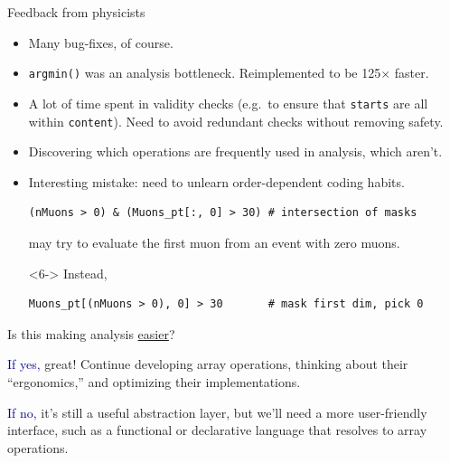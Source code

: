 \documentclass[aspectratio=169]{beamer}
\begin{document}
\begin{frame}[fragile]{Feedback from physicists}
\vspace{0.5 cm}\large
\begin{itemize}\setlength{\itemsep}{0.3 cm}
\item<1-> Many bug-fixes, of course.
\item<2-> {\tt\small argmin()} was an analysis bottleneck. Reimplemented to be 125$\times$ faster.
\item<3-> A lot of time spent in validity checks (e.g.\ to ensure that {\tt \small starts} are all within {\tt \small content}). Need to avoid redundant checks without removing safety.
\item<4-> Discovering which operations are frequently used in analysis, which aren't.
\item<5-> Interesting mistake: need to unlearn order-dependent coding habits.

\small\begin{verbatim}
(nMuons > 0) & (Muons_pt[:, 0] > 30) # intersection of masks
\end{verbatim}
\large

may try to evaluate the first muon from an event with zero muons.

\vspace{0.25 cm}
\begin{uncoverenv}<6->
Instead,

\small\begin{verbatim}
Muons_pt[(nMuons > 0), 0] > 30       # mask first dim, pick 0
\end{verbatim}
\end{uncoverenv}
\end{itemize}
\end{frame}

\begin{frame}{Is this making analysis \underline{easier}?}
\vspace{0.5 cm}
\Large

\begin{center}
\begin{minipage}{0.8\linewidth}
\textcolor{darkblue}{If yes,} great! Continue developing array operations, thinking about their ``ergonomics,'' and optimizing their implementations.

\vspace{0.75 cm}
\textcolor{darkblue}{If no,} it's still a useful abstraction layer, but we'll need a more user-friendly interface, such as a functional or declarative language that resolves to array operations.
\end{minipage}
\end{center}
\end{frame}
\end{document}

